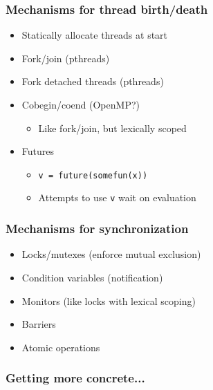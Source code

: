 \documentclass{beamer}
\begin{document}
\begin{frame}
  \frametitle{Mechanisms for thread birth/death}

  \begin{itemize}
  \item Statically allocate threads at start
  \item Fork/join (pthreads)
  \item Fork detached threads (pthreads)
  \item Cobegin/coend (OpenMP?)
    \begin{itemize}
    \item Like fork/join, but lexically scoped
    \end{itemize}
  \item Futures
    \begin{itemize}
    \item {\tt v = future(somefun(x))}
    \item Attempts to use {\tt v} wait on evaluation
    \end{itemize}
  \end{itemize}
\end{frame}


\begin{frame}
  \frametitle{Mechanisms for synchronization}

  \begin{itemize}
  \item Locks/mutexes (enforce mutual exclusion)
  \item Condition variables (notification)
  \item Monitors (like locks with lexical scoping)
  \item Barriers
  \item Atomic operations
  \end{itemize}
\end{frame}


\begin{frame}
  \frametitle{Getting more concrete...}
\end{frame}
\end{document}
